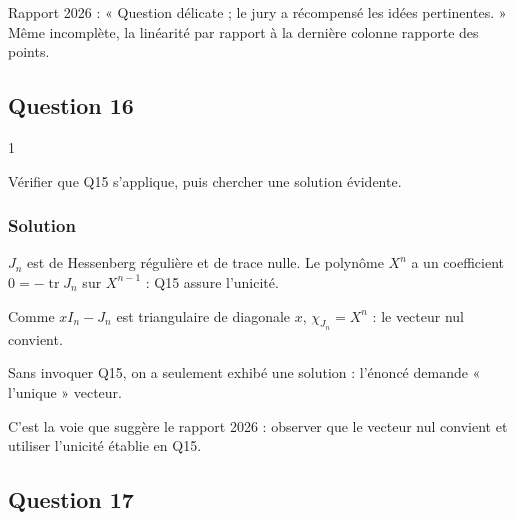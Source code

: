 \documentclass[11pt,a4paper]{article}
\newcommand{\equationajustee}[1]{%
  \sbox{\boiteequation}{$\displaystyle #1$}%
  \ifdim\wd\boiteequation>\linewidth
    \[\resizebox{\linewidth}{!}{\usebox{\boiteequation}}\]%
  \else
    \[#1\]%
  \fi}
\begin{document}
\begin{jury}

Rapport 2026 : « Question délicate ; le jury a récompensé les idées pertinentes. » Même incomplète, la linéarité par rapport à la dernière colonne rapporte des points.

\end{jury}

\hypertarget{question-16}{%
\subsection{Question 16}\label{question-16}}

\begin{indication}{1}

Vérifier que Q15 s'applique, puis chercher une solution évidente.

\end{indication}

\hypertarget{solution-15}{%
\subsubsection{Solution}\label{solution-15}}

\(J_n\) est de Hessenberg régulière et de trace nulle. Le polynôme \(X^n\) a un coefficient \(0=-\operatorname{tr}J_n\) sur \(X^{n-1}\) : Q15 assure l'unicité.

Comme \(xI_n-J_n\) est triangulaire de diagonale \(x\), \(\chi_{J_n}=X^n\) : le vecteur nul convient.

\equationajustee{\boxed{C=0.}}

\begin{piege}

Sans invoquer Q15, on a seulement exhibé une solution : l'énoncé demande « l'unique » vecteur.

\end{piege}

\begin{jury}

C'est la voie que suggère le rapport 2026 : observer que le vecteur nul convient et utiliser l'unicité établie en Q15.

\end{jury}

\hypertarget{question-17}{%
\subsection{Question 17}\label{question-17}}
\end{document}
